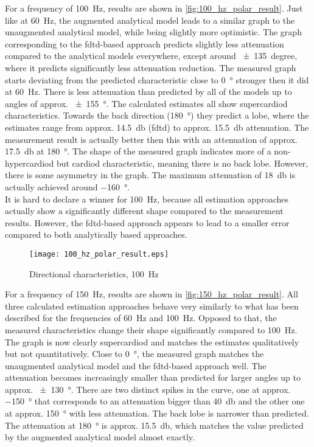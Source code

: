 For a frequency of \SI{100}{\hertz}, results are shown in \autoref{fig:100_hz_polar_result}. Just like at \SI{60}{\hertz}, the augmented analytical model leads to a similar graph to the unaugmented analytical model, while being slightly more optimistic. The graph corresponding to the \gls{fdtd}-based approach predicts slightly less attenuation compared to the analytical models everywhere, except around \SI{\pm 135}{degree}, where it predicts significantly less attenuation reduction. The measured graph starts deviating from the predicted characteristic close to \SI{0}{\degree} stronger then it did at \SI{60}{\hertz}. There is less attenuation than predicted by all of the models up to angles of approx. \SI{\pm 155}{\degree}. The calculated estimates all show supercardiod characteristics. Towards the back direction (\SI{180}{\degree}) they predict a lobe, where the estimates range from approx. \SI{14.5}{\decibel} (\gls{fdtd}) to approx. \SI{15.5}{\decibel} attenuation. The measurement result is actually better then this with an attenuation of approx. \SI{17.5}{\decibel} at \SI{180}{\degree}. The shape of the measured graph indicates more of a non-hypercardiod but cardiod characteristic, meaning there is no back lobe. However, there is some asymmetry in the graph. The maximum attenuation of \SI{18}{\decibel} is actually achieved around \SI{-160}{\degree}.\\
It is hard to declare a winner for \SI{100}{\hertz}, because all estimation approaches actually show a significantly different shape compared to the measurement results. However, the \gls{fdtd}-based approach appears to lead to a smaller error compared to both analytically based approaches. 
\begin{figure}[H]
	\centering
	\texttt{[image: 100\_hz\_polar\_result.eps]}
	\caption{Directional characteristics, \SI{100}{\hertz}}
		\label{fig:100_hz_polar_result}
\end{figure}
For a frequency of \SI{150}{\hertz}, results are shown in \autoref{fig:150_hz_polar_result}.
All three calculated estimation approaches behave very similarly to what has been described for the frequencies of \SI{60}{\hertz} and \SI{100}{\hertz}. Opposed to that, the measured characteristics change their shape significantly compared to \SI{100}{\hertz}. The graph is now clearly supercardiod and matches the estimates qualitatively but not quantitatively.
Close to \SI{0}{\degree}, the measured graph matches the unaugmented analytical model and the \gls{fdtd}-based approach well. The attenuation becomes increasingly smaller than predicted for larger angles up to approx. \SI{\pm 130}{\degree}. There are two distinct spikes in the curve, one at approx. \SI{-150}{\degree} that corresponds to an attenuation bigger than \SI{40}{\decibel} and the other one at approx. \SI{150}{\degree} with less attenuation. The back lobe is narrower than predicted. The attenuation at \SI{180}{\degree} is approx. \SI{15.5}{\decibel}, which matches the value predicted by the augmented analytical model almost exactly.\\
